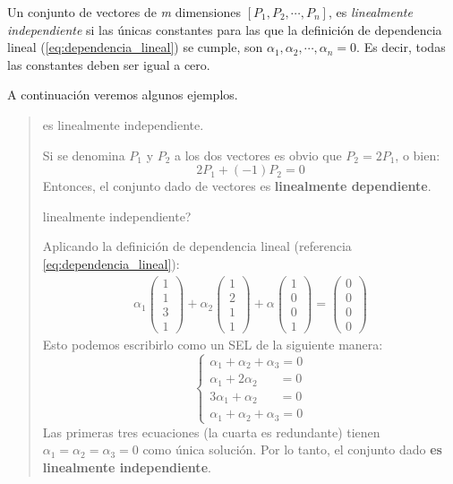 \vspace{5mm}

Un conjunto de vectores de \textit{m} dimensiones \(\left[P_1, P_2, \cdots, P_n\right]\), es \textit{linealmente independiente} si las únicas constantes para las que la definición de dependencia lineal (\ref{eq:dependencia_lineal}) se cumple, son \(\alpha_1, \alpha_2, \cdots, \alpha_n = 0\). Es decir, todas las constantes deben ser igual a cero.

A continuación veremos algunos ejemplos.
\vspace{5mm}

\begin{quote}
   es linealmente independiente.
  
  Si se denomina \(P_1\) y \(P_2\) a los dos vectores es obvio que \(P_2 = 2P_1\), o bien:
  \[
    2P_1 + (-1)P_2 = 0
  \]
  Entonces, el conjunto dado de vectores es \textbf{linealmente dependiente}.
  
  \vspace{5mm}

   linealmente independiente?

  Aplicando la definición de dependencia lineal (referencia \ref{eq:dependencia_lineal}):
  \begin{align*}
    \alpha_1 \begin{pmatrix}
      1 \\ 1 \\ 3 \\ 1
    \end{pmatrix} + \alpha_2 \begin{pmatrix}
      1 \\ 2 \\ 1 \\ 1
    \end{pmatrix} + \alpha \begin{pmatrix}
      1 \\ 0 \\ 0 \\ 1
    \end{pmatrix} = \begin{pmatrix}
      0 \\ 0 \\ 0 \\ 0
    \end{pmatrix}
  \end{align*}
  Esto podemos escribirlo como un SEL de la siguiente manera:
  \[
    \begin{cases}
      \alpha_1 + \alpha_2 + \alpha_3 = 0 \\
      \alpha_1 + 2\alpha_2 \phantom{+ a_3} = 0 \\
      3\alpha_1 + \alpha_2 \phantom{+ a_3} = 0 \\
      \alpha_1 + \alpha_2 + \alpha_3 = 0
    \end{cases}
  \]
  Las primeras tres ecuaciones (la cuarta es redundante) tienen \(\alpha_1 = \alpha_2 = \alpha_3 = 0\) como única solución. Por lo tanto, el conjunto dado \textbf{es linealmente independiente}. 
\end{quote}

